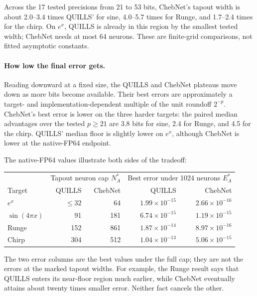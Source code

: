 \documentclass[11pt]{article}
\begin{document}
Across the 17 tested precisions from 21 to 53 bits, ChebNet's tapout width is about 2.0--3.4 times QUILLS' for sine, 4.0--5.7 times for Runge, and 1.7--2.4 times for the chirp. On \(e^x\), QUILLS is already in this region by the smallest tested width; ChebNet needs at most 64 neurons. These are finite-grid comparisons, not fitted asymptotic constants.

\paragraph{How low the final error gets.}
Reading downward at a fixed size, the QUILLS and ChebNet plateaus move down as more bits become available. Their best errors are approximately a target- and implementation-dependent multiple of the unit roundoff \(2^{-p}\). ChebNet's best error is lower on the three harder targets: the paired median advantages over the tested \(p\ge21\) are 3.8 bits for sine, 2.4 for Runge, and 4.5 for the chirp. QUILLS' median floor is slightly lower on \(e^x\), although ChebNet is lower at the native-FP64 endpoint.

The native-FP64 values illustrate both sides of the tradeoff:
\begin{center}\small
\begin{tabular}{lrrrr}
\toprule
&\multicolumn{2}{c}{Tapout neuron cap \(N_A^*\)}&\multicolumn{2}{c}{Best error under 1024 neurons \(E_A^*\)}\\
Target & QUILLS & ChebNet & QUILLS & ChebNet\\
\midrule
\(e^x\)&\(\le32\)&64&\(1.99\times10^{-15}\)&\(2.66\times10^{-16}\)\\
\(\sin(4\pi x)\)&91&181&\(6.74\times10^{-15}\)&\(1.19\times10^{-15}\)\\
Runge&152&861&\(1.87\times10^{-14}\)&\(8.97\times10^{-16}\)\\
Chirp&304&512&\(1.04\times10^{-13}\)&\(5.06\times10^{-15}\)\\
\bottomrule
\end{tabular}
\end{center}
The two error columns are the best values under the full cap; they are not the errors at the marked tapout widths. For example, the Runge result says that QUILLS enters its near-floor region much earlier, while ChebNet eventually attains about twenty times smaller error. Neither fact cancels the other.
\end{document}
